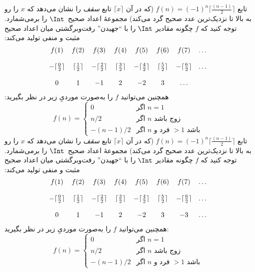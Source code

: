  {
  تابع $f(n) = (-1)^{n} \lceil \frac{(n-1)}{2}\rceil$ (که در آن
  $\lceil x \rceil$ تابع \emph{سقف} را نشان می‌دهد که $x$ را رو به بالا
  تا نزدیک‌ترین عدد صحیح گرد می‌کند) مجموعهٔ اعداد صحیح~$\Int$ را
  برمی‌شمارد. توجه کنید که $f$ چگونه مقادیر $\Int$ را با ``جهیدن'' رفت‌وبرگشتی
  میان اعداد صحیح مثبت و منفی تولید می‌کند:
  \[
  \begin{array}{c c c c c c c c}
  f(1) & f(2) & f(3) & f(4) & f(5) & f(6) & f(7) & \dots \\ \\
  - \lceil \tfrac{0}{2} \rceil & \lceil \tfrac{1}{2}\rceil & - \lceil \tfrac{2}{2} \rceil & \lceil \tfrac{3}{2} \rceil & - \lceil \tfrac{4}{2} \rceil  & \lceil \tfrac{5}{2}
  \rceil & - \lceil \tfrac{6}{2} \rceil & \dots \\ \\
  0 & 1 & -1 & 2 & -2 & 3 & \dots
  \end{array}
  \]
  همچنین می‌توانید $f$ را به‌صورت موردیِ زیر در نظر بگیرید:
  \[
  f(n) = \begin{cases}
    0 & \text{اگر $n = 1$}\\
    n/2 & \text{اگر $n$ زوج باشد}\\
    -(n-1)/2 & \text{اگر $n$ فرد و $>1$ باشد}
    \end{cases}
  \]
 }
 {
  تابع $f(n) = (-1)^{n} \lceil \frac{(n-1)}{2}\rceil$ (که در آن
  $\lceil x \rceil$ تابع \emph{سقف} را نشان می‌دهد که $x$ را رو به بالا
  تا نزدیک‌ترین عدد صحیح گرد می‌کند) مجموعهٔ اعداد صحیح~$\Int$ را
  برمی‌شمارد. توجه کنید که $f$ چگونه مقادیر $\Int$ را با ``جهیدن'' رفت‌وبرگشتی
  میان اعداد صحیح مثبت و منفی تولید می‌کند:
  \[
  \begin{array}{c c c c c c c c}
  f(1) & f(2) & f(3) & f(4) & f(5) & f(6) & f(7) & \dots \\ \\
  - \lceil \tfrac{0}{2} \rceil & \lceil \tfrac{1}{2}\rceil & - \lceil \tfrac{2}{2} \rceil & \lceil \tfrac{3}{2} \rceil & - \lceil \tfrac{4}{2} \rceil  & \lceil \tfrac{5}{2}
  \rceil & - \lceil \tfrac{6}{2} \rceil & \dots \\ \\
  0 & 1 & -1 & 2 & -2 & 3 & -3 & \dots
  \end{array}
  \]
  همچنین می‌توانید $f$ را به‌صورت موردیِ زیر در نظر بگیرید:
  \[
  f(n) = \begin{cases}
    0 & \text{اگر $n = 1$}\\
    n/2 & \text{اگر $n$ زوج باشد}\\
    -(n-1)/2 & \text{اگر $n$ فرد و $>1$ باشد}
    \end{cases}
  \]
 }


